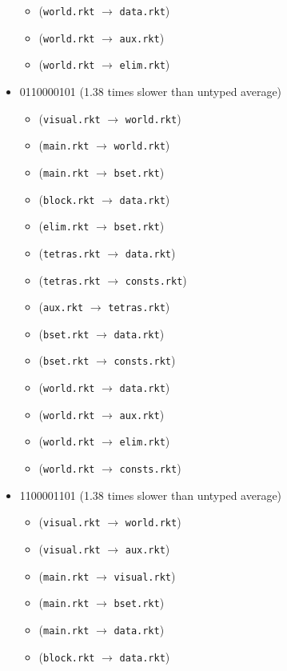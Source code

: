 \documentclass{article}
\newcommand{\mono}[1]{\texttt{#1}}
\begin{document}
\begin{itemize}
\begin{itemize}
  \item (\mono{world.rkt} $\rightarrow$ \mono{data.rkt})
  \item (\mono{world.rkt} $\rightarrow$ \mono{aux.rkt})
  \item (\mono{world.rkt} $\rightarrow$ \mono{elim.rkt})
  \end{itemize}
\item 0110000101 (1.38 times slower than untyped average)
  \begin{itemize}
  \item (\mono{visual.rkt} $\rightarrow$ \mono{world.rkt})
  \item (\mono{main.rkt} $\rightarrow$ \mono{world.rkt})
  \item (\mono{main.rkt} $\rightarrow$ \mono{bset.rkt})
  \item (\mono{block.rkt} $\rightarrow$ \mono{data.rkt})
  \item (\mono{elim.rkt} $\rightarrow$ \mono{bset.rkt})
  \item (\mono{tetras.rkt} $\rightarrow$ \mono{data.rkt})
  \item (\mono{tetras.rkt} $\rightarrow$ \mono{consts.rkt})
  \item (\mono{aux.rkt} $\rightarrow$ \mono{tetras.rkt})
  \item (\mono{bset.rkt} $\rightarrow$ \mono{data.rkt})
  \item (\mono{bset.rkt} $\rightarrow$ \mono{consts.rkt})
  \item (\mono{world.rkt} $\rightarrow$ \mono{data.rkt})
  \item (\mono{world.rkt} $\rightarrow$ \mono{aux.rkt})
  \item (\mono{world.rkt} $\rightarrow$ \mono{elim.rkt})
  \item (\mono{world.rkt} $\rightarrow$ \mono{consts.rkt})
  \end{itemize}
\item 1100001101 (1.38 times slower than untyped average)
  \begin{itemize}
  \item (\mono{visual.rkt} $\rightarrow$ \mono{world.rkt})
  \item (\mono{visual.rkt} $\rightarrow$ \mono{aux.rkt})
  \item (\mono{main.rkt} $\rightarrow$ \mono{visual.rkt})
  \item (\mono{main.rkt} $\rightarrow$ \mono{bset.rkt})
  \item (\mono{main.rkt} $\rightarrow$ \mono{data.rkt})
  \item (\mono{block.rkt} $\rightarrow$ \mono{data.rkt})

\end{itemize}
\end{itemize}
\end{document}
